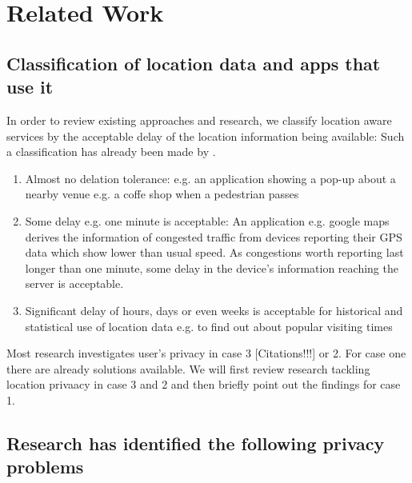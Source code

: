 \chapter{Related Work}\label{chapter:related-work}

\section{Classification of location data and apps that use it}
In order to review existing approaches and research, we classify location aware services by the acceptable delay of the location information being available:
Such a classification has already been made by \parencite{hoh2005protecting}.
\begin{enumerate}
  \item Almost no delation tolerance: e.g. an application showing a pop-up about a nearby venue e.g. a coffe shop when a pedestrian passes
  \item Some delay e.g. one minute is acceptable: An application e.g. google maps derives the information of congested traffic from devices reporting their GPS data which show lower than usual speed. As congestions worth reporting last longer than one minute, some delay in the device's information reaching the server is acceptable.
  \item Significant delay of hours, days or even weeks is acceptable for historical and statistical use of location data e.g. to find out about popular visiting times
\end{enumerate}
Most research investigates user's privacy in case 3 [Citations!!!] or 2. For case one there are already solutions available.
We will first review research tackling location privaacy in case 3 and 2 and then briefly point out the findings for case 1.



\section{Research has identified the following privacy problems}

